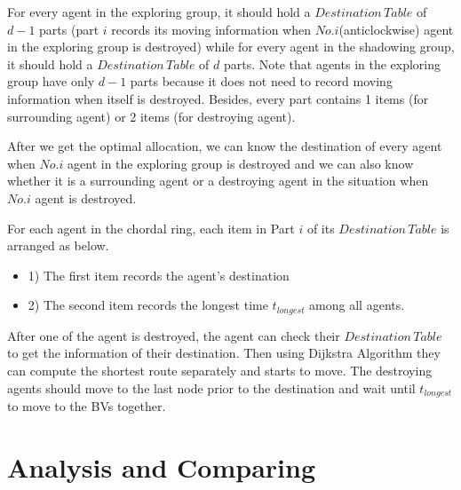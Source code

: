 For every agent in the exploring group, it should hold a $Destination\,Table$ of $d-1$ parts (part $i$ records its moving information when $No.i$(anticlockwise) agent in the exploring group is destroyed) while for every agent in the shadowing group, it should hold a $Destination\,Table$ of $d$ parts. Note that agents in the exploring group have only $d-1$ parts because it does not need to record moving information when itself is destroyed. Besides, every part contains 1 items (for surrounding agent) or 2 items (for destroying agent). 

After we get the optimal allocation, we can know the destination of every agent when $No.i$ agent in the exploring group is destroyed and we can also know whether it is a surrounding agent or a destroying agent in the situation when $No.i$ agent is destroyed.

For each agent in the chordal ring, each item in Part $i$ of its $Destination\,Table$ is arranged as below. 
\begin{itemize}
\item 1) The first item records the agent's destination
\item 2) The second item records the longest time $t_{longest}$ among all agents.
\end{itemize}


After one of the agent is destroyed, the agent can check their $Destination\,Table$ to get the information of their destination. Then using Dijkstra Algorithm they can compute the shortest route separately and starts to move. The destroying agents should move to the last node prior to the destination and wait until $t_{longest}$ to move to the BVs together. 


\section{Analysis and Comparing}
